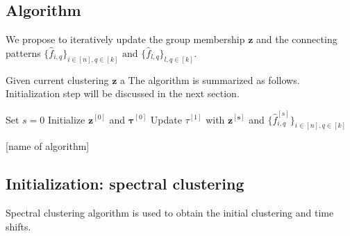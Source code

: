 



\subsection{Algorithm}
We propose to iteratively update the group membership $\mathbf{z}$ and the connecting patterns $\{\hat f_{i,q}\}_{i\in[n],q\in[k]} \text{ and } \{\hat f_{l,q}\}_{l,q\in[k]}$.

Given current clustering $\mathbf{z}$ a
The algorithm is summarized as follows. Initialization step will be discussed in the next section.

\begin{algorithm}[H]
\SetAlgoLined
 Set $s=0$\;
 Initialize $\mathbf{z}^{[0]}$ and $\mathbf{\tau}^{[0]}$\;
 Update $\tau^{[1]}$ with $\mathbf{z^{[s]}}$ and $\{\hat f_{i,q}^{[s]}\}_{i\in[n],q\in[k]}$\;
 \caption{ [name of algorithm]}
\end{algorithm}



\subsection{Initialization: spectral clustering}
Spectral clustering algorithm is used to obtain the initial clustering and time shifts.

